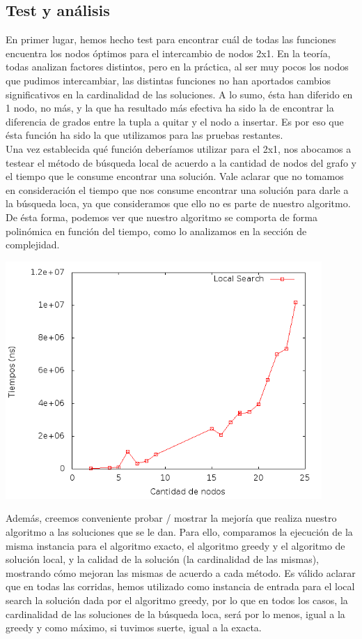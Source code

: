 \subsection{Test y análisis}
En primer lugar, hemos hecho test para encontrar cuál de todas las funciones encuentra los nodos óptimos para el intercambio de nodos 2x1. En la teoría, todas analizan factores distintos, pero en la práctica, al ser muy pocos los nodos que pudimos intercambiar, las distintas funciones no han aportados cambios significativos en la cardinalidad de las soluciones. A lo sumo, ésta han diferido en 1 nodo, no más, y la que ha resultado más efectiva ha sido la de encontrar la diferencia de grados entre la tupla a quitar y el nodo a insertar. Es por eso que ésta función ha sido la que utilizamos para las pruebas restantes. \\
Una vez establecida qué función deberíamos utilizar para el 2x1, nos abocamos a testear el método de búsqueda local de acuerdo a la cantidad de nodos del grafo y el tiempo que le consume encontrar una solución. Vale aclarar que no tomamos en consideración el tiempo que nos consume encontrar una solución para darle a la búsqueda loca, ya que consideramos que ello no es parte de nuestro algoritmo. De ésta forma, podemos ver que nuestro algoritmo se comporta de forma polinómica en función del tiempo, como lo analizamos en la sección de complejidad.

\begin{center}
\includegraphics[width=12cm]{./graficos/tiempoLocalSearch.png}
\end{center}

Además, creemos conveniente probar / mostrar la mejoría que realiza nuestro algoritmo a las soluciones que se le dan. Para ello, comparamos la ejecución de la misma instancia para el algoritmo exacto, el algoritmo greedy y el algoritmo de solución local, y la calidad de la solución (la cardinalidad de las mismas), mostrando cómo mejoran las mismas de acuerdo a cada método. Es válido aclarar que en todas las corridas, hemos utilizado como instancia de entrada para el local search la solución  dada por el algoritmo greedy, por lo que en todos los casos, la cardinalidad de las soluciones de la búsqueda loca, será por lo menos, igual a la greedy y como máximo, si tuvimos suerte, igual a la exacta.

